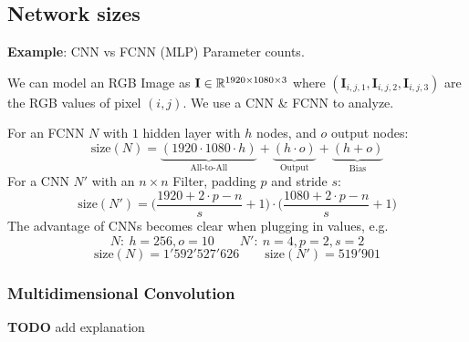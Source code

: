 \newpage

\subsection{Network sizes}



{\footnotesize
    \textbf{Example}: CNN vs FCNN (MLP) Parameter counts.

    We can model an RGB Image as $\mathbf{I}\in\mathbb{R}^{1920\times1080\times3}$ where
    $(\mathbf{I}_{i,j,1},\mathbf{I}_{i,j,2},\mathbf{I}_{i,j,3})$ are the RGB values of pixel $(i,j)$. We use a CNN \& FCNN to analyze.

    For an FCNN $N$ with $1$ hidden layer with $h$ nodes, and $o$ output nodes:
    $$
        \text{size}(N) = \underbrace{(1920 \cdot 1080 \cdot h)}_{\text{All-to-All}} + \underbrace{(h \cdot o)}_\text{Output} + \underbrace{(h + o)}_\text{Bias}
    $$
    For a CNN $N'$ with an $n\times n$ Filter, padding $p$ and stride $s$:
    $$
        \text{size}(N') = \biggl(\frac{1920 + 2\cdot p - n}{s}+1\biggr)\cdot\biggl(\frac{1080+2\cdot p - n}{s}+1\biggr)
    $$
    The advantage of CNNs becomes clear when plugging in values, e.g.
    $$
        N:\ h=256, o=10 \qquad N':\ n=4, p=2, s=2 
    $$
    $$
    \text{size}(N) = 1'592'527'626 \qquad \text{size}(N') = 519'901
    $$
}

\subsubsection{Multidimensional Convolution}
\textbf{TODO} add explanation

